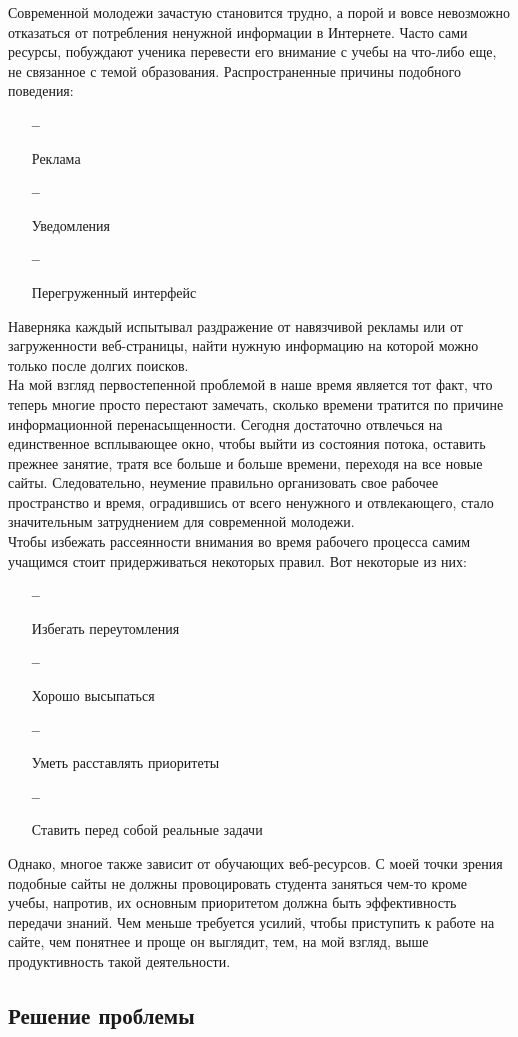 \documentclass[a4paper, 12pt]{extarticle}
\begin{document}
Современной молодежи зачастую становится трудно, а порой и вовсе невозможно
отказаться от потребления ненужной информации в Интернете. Часто сами ресурсы,
побуждают ученика перевести его внимание с учебы на что-либо еще, не связанное
с темой образования. Распространенные причины подобного поведения:
\begin{itemize}
    \item[\bfseries--] {\small Реклама\par}
    \item[\bfseries--] {\small Уведомления\par}
    \item[\bfseries--] {\small Перегруженный интерфейс\par}
\end{itemize}
Наверняка каждый испытывал раздражение от навязчивой рекламы или от
загруженности веб-страницы, найти нужную информацию на которой можно только
после долгих поисков.
\\

На мой взгляд первостепенной проблемой в наше время является тот факт, что
теперь многие просто перестают замечать, сколько времени тратится по причине
информационной перенасыщенности. Сегодня достаточно отвлечься на единственное
всплывающее окно, чтобы выйти из состояния потока, оставить прежнее занятие,
тратя все больше и больше времени, переходя на все новые сайты. Следовательно,
неумение правильно организовать свое рабочее пространство и время, оградившись от всего
ненужного и отвлекающего, стало значительным затруднением для современной
молодежи.
\\

Чтобы избежать рассеянности внимания во время рабочего процесса самим учащимся
стоит придерживаться некоторых правил. Вот некоторые из них:
\begin{itemize}
    \item[\bfseries--] {\small Избегать переутомления\par}
    \item[\bfseries--] {\small Хорошо высыпаться\par}
    \item[\bfseries--] {\small Уметь расставлять приоритеты\par}
    \item[\bfseries--] {\small Ставить перед собой реальные задачи\par}
\end{itemize}
Однако, многое также зависит от обучающих веб-ресурсов. С моей точки зрения
подобные сайты не должны провоцировать студента заняться чем-то кроме учебы,
напротив, их основным приоритетом должна быть эффективность передачи знаний.
Чем меньше требуется усилий, чтобы приступить к работе на сайте, чем понятнее и
проще он выглядит, тем, на мой взгляд, выше продуктивность такой деятельности.
\newpage

\subsection{Решение проблемы}

\newpage

{}

\end{document}
